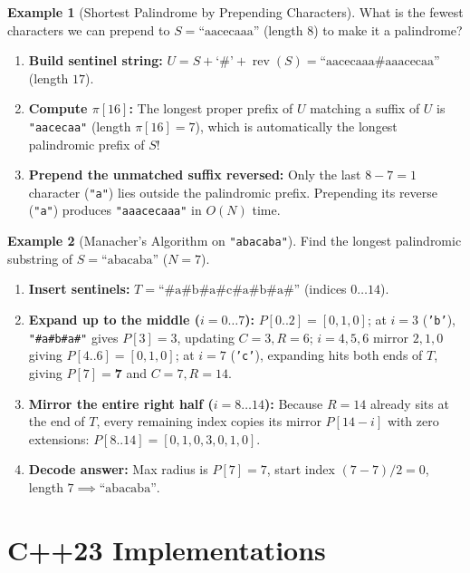 \documentclass[11pt,a4paper]{article}
\theoremstyle{definition}
\newtheorem{example}{Example}[section]
\begin{document}
\begin{example}[Shortest Palindrome by Prepending Characters]
What is the fewest characters we can prepend to $S = \text{``aacecaaa''}$ (length $8$) to make it a palindrome?
\begin{enumerate}
    \item \textbf{Build sentinel string:} $U = S + \text{`\#'} + \operatorname{rev}(S) = \text{``aacecaaa\#aaacecaa''}$ (length $17$).
    \item \textbf{Compute $\pi[16]$:} The longest proper prefix of $U$ matching a suffix of $U$ is \texttt{"aacecaa"} (length $\pi[16] = 7$), which is automatically the longest palindromic prefix of $S$!
    \item \textbf{Prepend the unmatched suffix reversed:} Only the last $8 - 7 = 1$ character (\texttt{"a"}) lies outside the palindromic prefix. Prepending its reverse (\texttt{"a"}) produces \texttt{"aaacecaaa"} in $O(N)$ time.
\end{enumerate}
\end{example}

\begin{example}[Manacher's Algorithm on \texttt{"abacaba"}]
Find the longest palindromic substring of $S = \text{``abacaba''}$ ($N = 7$).
\begin{enumerate}
    \item \textbf{Insert sentinels:} $T = \text{``\#a\#b\#a\#c\#a\#b\#a\#''}$ (indices $0 \dots 14$).
    \item \textbf{Expand up to the middle ($i = 0 \dots 7$):}
    $P[0..2] = [0, 1, 0]$;
    at $i = 3$ (\texttt{'b'}), \texttt{"\#a\#b\#a\#"} gives $P[3] = 3$, updating $C = 3, R = 6$;
    $i = 4, 5, 6$ mirror $2, 1, 0$ giving $P[4..6] = [0, 1, 0]$;
    at $i = 7$ (\texttt{'c'}), expanding hits both ends of $T$, giving $P[7] = \mathbf{7}$ and $C = 7, R = 14$.
    \item \textbf{Mirror the entire right half ($i = 8 \dots 14$):} Because $R = 14$ already sits at the end of $T$, every remaining index copies its mirror $P[14 - i]$ with zero extensions: $P[8..14] = [0, 1, 0, 3, 0, 1, 0]$.
    \item \textbf{Decode answer:} Max radius is $P[7] = 7$, start index $(7 - 7)/2 = 0$, length $7 \implies \text{``abacaba''}$.
\end{enumerate}
\end{example}

\section{C++23 Implementations}
\end{document}
